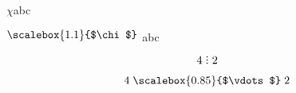 \documentclass[a4paper, 12pt]{article}
\newcommand{\Chi}{
    \raisebox{0.5ex} %
    {\scalebox{1.1}{$\chi$} %
    }
}
\newcommand{\divby}{ %
    \mathrel{\vbox{ %
        \baselineskip=0.65ex %
        \lineskiplimit=0pt %
        \hbox{.}\hbox{.}\hbox{.} %
    }}
}
\newcommand{\anodivby}{
    \mathrel{ %
        \scalebox{0.85}{$\vdots$} %
    }
}
\begin{document}
    $\chi$abc %

    $\Chi$abc %


    \[4 \divby 2\]

    \[4 \anodivby 2\]
\end{document}
